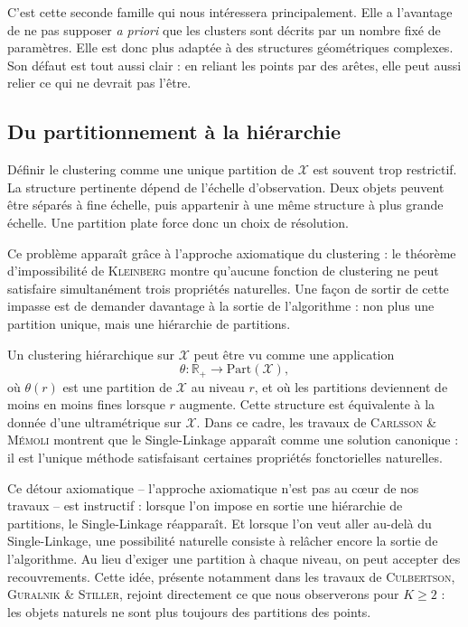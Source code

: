 C'est cette seconde famille qui nous intéressera principalement. Elle a l'avantage de ne pas supposer \emph{a priori} que les clusters sont décrits par un nombre fixé de paramètres. Elle est donc plus adaptée à des structures géométriques complexes. Son défaut est tout aussi clair : en reliant les points par des arêtes, elle peut aussi relier ce qui ne devrait pas l'être.

\subsection{Du partitionnement à la hiérarchie}

Définir le clustering comme une unique partition de $\mathcal X$ est souvent trop restrictif. La structure pertinente dépend de l'échelle d'observation. Deux
objets peuvent être séparés à fine échelle, puis appartenir à une même structure à plus grande échelle. Une partition plate force donc un choix de résolution.

Ce problème apparaît grâce à l'approche axiomatique du clustering : le théorème d'impossibilité de \textsc{Kleinberg} montre qu'aucune fonction de clustering ne peut satisfaire simultanément trois propriétés naturelles. Une façon de sortir de cette impasse est de demander davantage à la sortie de l'algorithme : non plus une partition unique, mais une hiérarchie de partitions.

Un clustering hiérarchique sur $\mathcal X$ peut être vu comme une application
\[
    \theta : \mathbb{R}_+ \longrightarrow \mathrm{Part}(\mathcal X),
\]
où $\theta(r)$ est une partition de $\mathcal X$ au niveau $r$, et où les partitions deviennent de moins en moins fines lorsque $r$ augmente. 
Cette structure est équivalente à la donnée d'une ultramétrique sur $\mathcal X$. 
Dans ce cadre, les travaux de \textsc{Carlsson \& Mémoli} montrent que le Single-Linkage apparaît comme une solution canonique : il est l'unique méthode satisfaisant certaines propriétés fonctorielles naturelles.

Ce détour axiomatique -- l'approche axiomatique n'est pas au cœur de nos travaux -- est instructif : lorsque l'on impose en sortie une hiérarchie de partitions, le Single-Linkage réapparaît. Et lorsque l'on veut aller au-delà du Single-Linkage, une possibilité naturelle consiste à relâcher encore la sortie de l'algorithme. 
Au lieu d'exiger une partition à chaque niveau, on peut accepter des recouvrements. Cette idée, présente notamment dans les travaux de \textsc{Culbertson, Guralnik \& Stiller}, rejoint directement ce que nous observerons pour $K\geq2$ : les objets naturels ne sont plus toujours des partitions des points.

